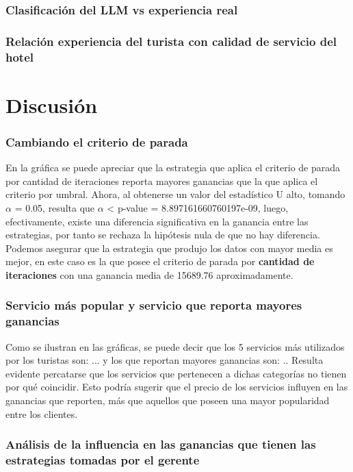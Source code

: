 \documentclass[12pt,a4paper]{article} \usepackage[spanish]{babel} \usepackage{graphicx} \usepackage{amsmath} \usepackage{amsfonts} \usepackage{amssymb} \usepackage{float} \usepackage{geometry}
\begin{document}
\subsubsection{Clasificación del LLM vs experiencia real}
\subsubsection{Relación experiencia del turista con calidad de servicio del hotel}

\section{Discusión}


\subsubsection{Cambiando el criterio de parada}
En la gráfica se puede apreciar que la estrategia que aplica el criterio de parada por cantidad de iteraciones reporta mayores ganancias que la que aplica el criterio por umbral. Ahora, al obtenerse un valor del estadístico U alto, tomando $\alpha$ = 0.05, resulta que $\alpha$ < p-value = 8.897161660760197e-09, luego, efectivamente, existe una diferencia significativa en la ganancia entre las estrategias, por tanto se rechaza la hipótesis nula de que no hay diferencia. Podemos asegurar que la estrategia que produjo los datos con mayor media es mejor, en este caso es la que posee el criterio de parada por \textbf{cantidad de iteraciones} con una ganancia media de 15689.76 aproximadamente.
\subsubsection{Servicio más popular y servicio que reporta mayores ganancias}
Como se ilustran en las gráficas, se puede decir que los 5 servicios más utilizados por los turistas son: ... y los que reportan mayores ganancias son: .. Resulta evidente percatarse que los servicios que pertenecen a dichas categorías no tienen por qué coincidir. Esto podría sugerir que el precio de los servicios influyen en las ganancias que reporten, más que aquellos que poseen una mayor popularidad entre los clientes.
\subsubsection{Análisis de la influencia en las ganancias que tienen las estrategias tomadas por el gerente}
\end{document}
